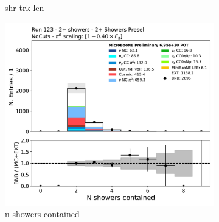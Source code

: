 \begin{figure}[H]
\begin{subfigure}{0.3\textwidth}
    \caption{shr trk len}
    \end{subfigure}
    \begin{subfigure}{0.3\textwidth}
    \includegraphics[width=1.0\textwidth]{Sidebands/Figures/TwoShr_1e0pSel/Presel/n_showers_contained.pdf}
    \caption{n showers contained}
    \end{subfigure}
    \caption{} 
    \label{fig:HE_1eNp_1}
\end{figure}


